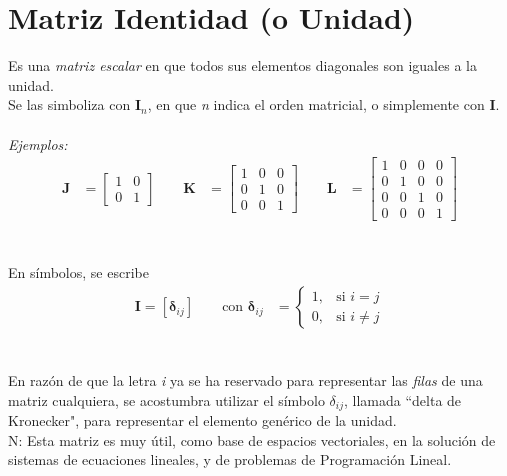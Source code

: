 \documentclass[a4paper,12pt]{report} %
\begin{document}
\section{Matriz Identidad (o Unidad)}
Es una \textit{matriz escalar} en que todos sus elementos diagonales son iguales a la unidad.\\
Se las simboliza con \(\mathbf{I}_\mathit{n}\), en que \textit{n} indica el orden matricial, o simplemente con \textbf{I}. \\ \\
\textit{Ejemplos:} \\
\[
\begin{aligned}
\mathbf{J} &= \begin{bmatrix}
    1 & 0 \\
    0 & 1
\end{bmatrix}
\qquad
\mathbf{K} &= \begin{bmatrix}
    1  & 0 & 0 \\
    0 & 1 & 0 \\
    0 & 0 & 1
\end{bmatrix}
\qquad
\mathbf{L} &= \begin{bmatrix}
    1 & 0 & 0 & 0\\
    0 & 1 & 0 & 0\\
    0 & 0 & 1 & 0\\
    0 & 0 & 0 & 1
\end{bmatrix}
\end{aligned}
\]
\\ \\
En símbolos, se escribe
\[
\begin{aligned}
    \mathbf{I} = \left[\mathit{\mathbf{\delta}_{ij}}\right]
    \qquad
    \text{con } \mathbf{\delta}_{ij} &= \begin{cases}
        1, & \text{si } \mathit{i = j} \\
        0, & \text{si } \mathit{i\neq j}
    \end{cases}
\end{aligned}
\]
\\ \\
En razón de que la letra \textit{i} ya se ha reservado para representar las \textit{filas} de una matriz cualquiera, se acostumbra utilizar el símbolo \(\delta_{ij}\), llamada ``delta de Kronecker", para representar el elemento genérico de la unidad.\\
N\scalebox{0.8}{OTA}: Esta matriz es muy útil, como base de espacios vectoriales, en la solución de sistemas de ecuaciones lineales, y de problemas de Programación Lineal.
\\ 
\end{document}
